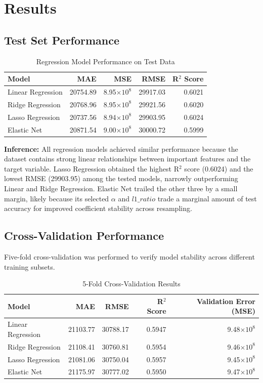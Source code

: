 \documentclass[12pt,a4paper]{article}
\begin{document}
\section{Results}

\subsection{Test Set Performance}

\begin{table}[H]
\centering
\begin{tabular}{lrrrr}
\toprule
Model & MAE & MSE & RMSE & R$^2$ Score \\
\midrule
Linear Regression & 20754.89 & 8.95$\times10^{8}$ & 29917.03 & 0.6021 \\
Ridge Regression & 20768.96 & 8.95$\times10^{8}$ & 29921.56 & 0.6020 \\
Lasso Regression & 20737.56 & 8.94$\times10^{8}$ & 29903.95 & 0.6024 \\
Elastic Net & 20871.54 & 9.00$\times10^{8}$ & 30000.72 & 0.5999 \\
\bottomrule
\end{tabular}
\caption{Regression Model Performance on Test Data}
\end{table}

\textbf{Inference:} All regression models achieved similar performance because the dataset contains strong linear relationships between important features and the target variable. Lasso Regression obtained the highest R$^2$ score (0.6024) and the lowest RMSE (29903.95) among the tested models, narrowly outperforming Linear and Ridge Regression. Elastic Net trailed the other three by a small margin, likely because its selected $\alpha$ and $l1\_ratio$ trade a marginal amount of test accuracy for improved coefficient stability across resampling.

\subsection{Cross-Validation Performance}

Five-fold cross-validation was performed to verify model stability across different training subsets.

\begin{table}[H]
\centering
\begin{tabular}{lrrrr}
\toprule
Model & MAE & RMSE & R$^2$ Score & Validation Error (MSE) \\
\midrule
Linear Regression & 21103.77 & 30788.17 & 0.5947 & 9.48$\times10^{8}$ \\
Ridge Regression & 21108.41 & 30760.81 & 0.5954 & 9.46$\times10^{8}$ \\
Lasso Regression & 21081.06 & 30750.04 & 0.5957 & 9.45$\times10^{8}$ \\
Elastic Net & 21175.97 & 30777.02 & 0.5950 & 9.47$\times10^{8}$ \\
\bottomrule
\end{tabular}
\caption{5-Fold Cross-Validation Results}
\end{table}
\end{document}
